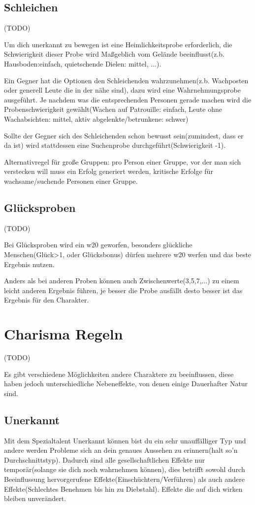 \section{Schleichen}
(TODO)

Um dich unerkannt zu bewegen ist eine Heimlichkeitsprobe erforderlich, die Schwierigkeit dieser Probe wird Maßgeblich vom Gelände beeinflusst(z.b. Hausboden:einfach, quietschende Dielen: mittel, ...).

Ein Gegner hat die Optionen den Schleichenden wahrzunehmen(z.b. Wachposten oder generell Leute die in der nähe sind), dazu wird eine Wahrnehmungsprobe ausgeführt. Je nachdem was die entsprechenden Personen gerade machen wird die Probenschwierigkeit gewählt(Wachen auf Patrouille: einfach, Leute ohne Wachabsichten: mittel, aktiv abgelenkte/betrunkene: schwer)

Sollte der Gegner sich des Schleichenden schon bewusst sein(zumindest, dass er da ist) wird stattdessen eine Suchenprobe durchgeführt(Schwierigkeit -1).

Alternativregel für große Gruppen: pro Person einer Gruppe, vor der man sich verstecken will muss ein Erfolg generiert werden, kritische Erfolge für wachsame/suchende Personen einer Gruppe.

\section{Glücksproben}
(TODO)

Bei Glücksproben wird ein w20 geworfen, besonders glückliche Menschen(Glück>1, oder Glücksbonus) dürfen mehrere w20 werfen und das beste Ergebnis nutzen.

Anders als bei anderen Proben können auch Zwischenwerte(3,5,7,...) zu einem leicht anderen Ergebnis führen, je besser die Probe ausfällt desto besser ist das Ergebnis für den Charakter.
\chapter{Charisma Regeln}
(TODO)

Es gibt verschiedene Möglichkeiten andere Charaktere zu beeinflussen, diese haben jedoch unterschiedliche Nebeneffekte, von denen einige Dauerhafter Natur sind.

\section{Unerkannt}
\label{Unerkannt}
Mit dem Spezialtalent Unerkannt können bist du ein sehr unauffälliger Typ und andere werden Probleme sich an dein genaues Aussehen zu erinnern(halt so'n Durchschnittstyp). Dadurch sind alle gesellschaftlichen Effekte nur temporär(solange sie dich noch wahrnehmen können), dies betrifft sowohl durch Beeinflussung hervorgerufene Effekte(Einschüchtern/Verführen) als auch andere Effekte(Schlechtes Benehmen bis hin zu Diebstahl). Effekte die auf dich wirken bleiben unverändert.

